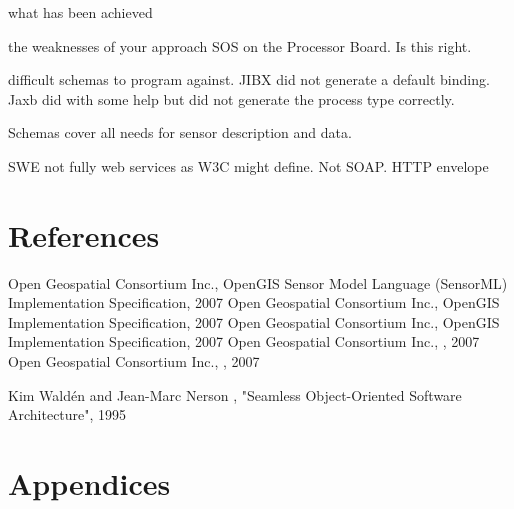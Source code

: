 \documentclass[]{final_report}
\begin{document}
what has been achieved

the weaknesses of your approach
SOS on the Processor Board. Is this right.

difficult schemas to program against.
JIBX did not generate a default binding.
Jaxb did with some help but did not generate the process type correctly.

Schemas cover all needs for sensor description and data.

SWE not fully web services as W3C might define. Not SOAP. HTTP envelope


\chapter{References}
\newpage
\begin{thebibliography}{99}
Open Geospatial Consortium Inc., OpenGIS Sensor Model Language (SensorML) Implementation Specification, 2007
Open Geospatial Consortium Inc., OpenGIS  Implementation Specification, 2007
Open Geospatial Consortium Inc., OpenGIS  Implementation Specification, 2007
Open Geospatial Consortium Inc., , 2007
Open Geospatial Consortium Inc., , 2007


Kim Waldén and Jean-Marc Nerson , "Seamless Object-Oriented Software Architecture", 1995
\end{thebibliography}
\label{endpage}


\chapter{Appendices}

\lstset{language=XML,basicstyle=\small}

\end{document}
